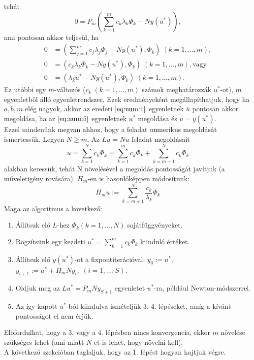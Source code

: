 \documentclass[oneside, titlepage, 12pt, a4paper]{report}
\begin{document}
tehát
\begin{equation*}
0 = P_m (\sum_{k = 1}^m c_k \lambda_k \Phi_k - N y(u^*)),
\end{equation*}
ami pontosan akkor teljesül, ha
\begin{align}
0 &= (\sum_{j = 1}^m c_j \lambda_j \Phi_j - N y(u^*), \Phi_k) \; (k = 1, \dots, m), \nonumber \\
0 &= (c_k \lambda_k \Phi_k - N y(u^*), \Phi_k) \; (k = 1, \dots, m), \text{vagy} \nonumber \\
0 &= (\lambda_k u^* - N y(u^*), \Phi_k) \; (k = 1, \dots, m). \label{eq:num:5}
\end{align}
Ez utóbbi egy $m$-változós ($c_k \; (k = 1, \dots, m)$ számok meghatározzák $u^*$-ot), $m$ egyenletből álló egyenletrendszer. Ezek eredményeként megállapíthatjuk, hogy ha $a, b, m$ elég nagyok, akkor az eredeti $\eqref{eq:num:1}$ egyenletnek $\overline{u}$ pontosan akkor megoldása, ha az $\eqref{eq:num:5}$ egyenletnek $u^*$ megoldása és $\overline{u} = y(u^*)$. \\
Ezzel mindenünk megvan ahhoz, hogy a feladat numerikus megoldását ismertessük. Legyen $N \geq m$. Az $Lu = Nu$ feladat megoldásait
\begin{equation*}
u = \sum_{k = 1}^N c_k \Phi_k = \sum_{k = 1}^m c_k \Phi_k + \sum_{k = m+1}^N c_k \Phi_k
\end{equation*}
alakban keressük, tehát N növelésével a megoldás pontosságát javítjuk (a műveletigény rovására). $H_m$-en is hasonlóképpen módosítunk:
\begin{equation*}
H_m u := \sum_{k = m+1}^N \frac{c_k}{\lambda_k} \Phi_k
\end{equation*}
Maga az algoritmus a következő:
\begin{enumerate}
\item Állítsuk elő $L$-hez $\Phi_k (k = 1, \dots, N)$ sajátfüggvényeket.
\item Rögzítsünk egy kezdeti $u^* = \sum_{k = 1}^m c_k \Phi_k$ kiinduló értéket.
\item Állítsuk elő $y(u^*)$-ot a fixpontiterációval: $y_0 := u^*$, $y_{i+1} := u^* + H_m N y_i, \; (i = 1, \dots, S)$.
\item Oldjuk meg az $Lu^* = P_m N y_{S+1}$ egyenletet $u^*$-ra, például Newton-módszerrel.
\item Az így kapott $u^*$-ból kiindulva ismételjük 3.-4. lépéseket, amíg a kívánt pontosságot el nem érjük.
\end{enumerate}
Előfordulhat, hogy a 3. vagy a 4. lépésben nincs konvergencia, ekkor $m$ növelése szükséges lehet (ami miatt $N$-et is lehet, hogy növelni kell). \\
A következő szekcióban taglaljuk, hogy az 1. lépést hogyan hajtjuk végre.
\end{document}
